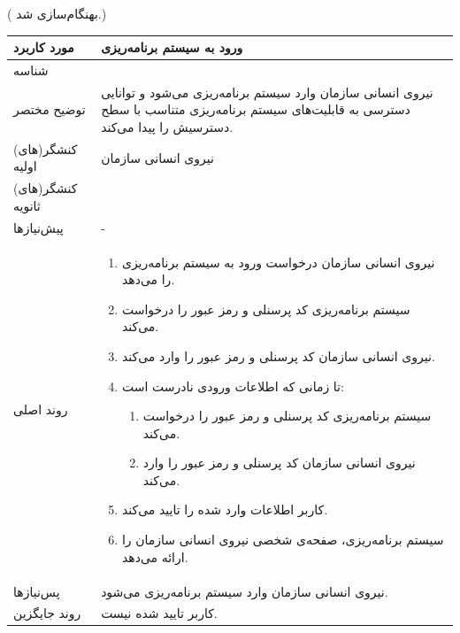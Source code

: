 \newpage
({\color{red} بهنگام‌سازی شد.})
\begin{table}[H]
	\centering
	\begin{tabular}{|p{3cm}|p{10cm}|}
		\hline
		مورد کاربرد & ورود به سیستم برنامه‌ریزی  \\
		\hline
		شناسه & 
		\stepcounter{usecase_ID}
		\arabic{usecase_ID} \\
		\hline
		توضیح مختصر & نیروی انسانی سازمان وارد سیستم برنامه‌ریزی می‌شود و توانایی دسترسی به قابلیت‌های سیستم برنامه‌ریزی متناسب با سطح دسترسیش را پیدا می‌کند. \\
		\hline
		کنشگر(های) اولیه & نیروی انسانی سازمان \\
		\hline
		کنشگر(های) ثانویه &  \\
		\hline
		پیش‌نیازها & - \\
		\hline
		
		روند اصلی &
		\begin{enumerate}[topsep=0cm,leftmargin=0.5cm]
			\item نیروی انسانی سازمان درخواست ورود به سیستم برنامه‌ریزی را می‌دهد.
			\item سیستم برنامه‌ریزی کد پرسنلی و رمز عبور را درخواست می‌کند. 
			\item نیروی انسانی سازمان کد پرسنلی و رمز عبور را وارد می‌کند. 
			\item تا زمانی که اطلاعات ورودی نادرست است: 
			\begin{enumerate}[topsep=0cm,leftmargin=0.5cm]
				\item سیستم برنامه‌ریزی کد پرسنلی و رمز عبور را درخواست می‌کند. 
				\item نیروی انسانی سازمان کد پرسنلی و رمز عبور را وارد می‌کند. 
			\end{enumerate}
			\item کاربر اطلاعات وارد شده را تایید می‌کند.
			\item سیستم برنامه‌ریزی، صفحه‌ی شخصی نیروی انسانی سازمان را ارائه می‌دهد. 
		\end{enumerate} \\
		
		\hline
		پس‌نیازها & نیروی انسانی سازمان وارد سیستم برنامه‌ریزی می‌شود. \\
		\hline
		روند جایگزین & کاربر تایید شده نیست. \\
		\hline
	\end{tabular}
\end{table}

